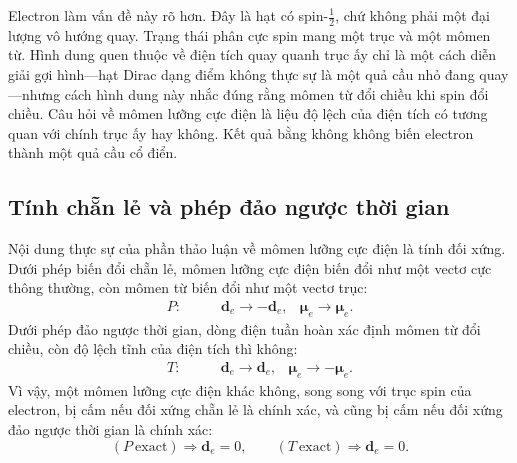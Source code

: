 Electron làm vấn đề này rõ hơn. Đây là hạt có spin-\(\tfrac12\), chứ không phải một đại lượng vô hướng quay. Trạng thái phân cực spin mang một trục và một mômen từ. Hình dung quen thuộc về điện tích quay quanh trục ấy chỉ là một cách diễn giải gợi hình---hạt Dirac dạng điểm không thực sự là một quả cầu nhỏ đang quay---nhưng cách hình dung này nhắc đúng rằng mômen từ đổi chiều khi spin đổi chiều. Câu hỏi về mômen lưỡng cực điện là liệu độ lệch của điện tích có tương quan với chính trục ấy hay không. Kết quả bằng không không biến electron thành một quả cầu cổ điển.

\begin{classroomqa}
\end{classroomqa}

\begin{classroomqa}
\end{classroomqa}

\subsection{Tính chẵn lẻ và phép đảo ngược thời gian}

Nội dung thực sự của phần thảo luận về mômen lưỡng cực điện là tính đối xứng. Dưới phép biến đổi chẵn lẻ, mômen lưỡng cực điện biến đổi như một vectơ cực thông thường, còn mômen từ biến đổi như một vectơ trục:
\begin{align}
P:\qquad &\mathbf d_e \to -\mathbf d_e,
&\boldsymbol{\mu}_e \to \boldsymbol{\mu}_e .
\end{align}
Dưới phép đảo ngược thời gian, dòng điện tuần hoàn xác định mômen từ đổi chiều, còn độ lệch tĩnh của điện tích thì không:
\begin{align}
T:\qquad &\mathbf d_e \to \mathbf d_e,
&\boldsymbol{\mu}_e \to -\boldsymbol{\mu}_e .
\end{align}
Vì vậy, một mômen lưỡng cực điện khác không, song song với trục spin của electron, bị cấm nếu đối xứng chẵn lẻ là chính xác, và cũng bị cấm nếu đối xứng đảo ngược thời gian là chính xác:
\begin{equation}
(P\ \text{exact}) \Rightarrow \mathbf d_e=0,
\qquad
(T\ \text{exact}) \Rightarrow \mathbf d_e=0.
\end{equation}

